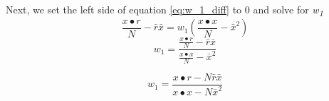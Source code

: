 \documentclass[12pt, letterpaper]{article}
\begin{document}
Next, we set the left side of equation \ref{eq:w_1_diff} to 0 and solve for \textit{w\textsubscript{1}}
\[\frac{x \bullet r}{N} - \bar{r}\bar{x} = w_1(\frac{x \bullet x}{N} - \bar{x}^2)\]
\[w_1 = \frac{\frac{x  \bullet r}{N} - \bar{r}\bar{x}}{\frac{x  \bullet x}{N} - \bar{x}^2} \]

\begin{equation}
w_1 = \frac{x  \bullet r - N\bar{r}\bar{x}}{x  \bullet x - N\bar{x}^2} \end{equation} 
\end{document}
